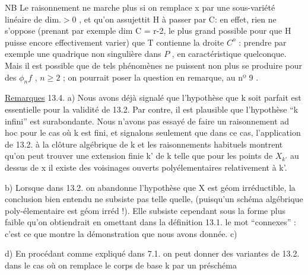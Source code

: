 
NB \quad Le raisonnement ne marche plus si on remplace x par une
sous-variété linéaire  de dim.$>0$ , et qu'on assujettit H à passer
par C: en effet, rien ne s'oppose (prenant par exemple dim C = r-2, le
plus grand possible pour que H puisse encore effectivement varier) que
T contienne la droite $C^{o}$ :
 prendre par
exemple une quadrique non singulière dans $P$ , en caractéristique quelconque. Mais il
est possible que de tels phénomènes ne puissent non plus se produire 
pour des $\phi_n f$ , $n\geq 2$ ; on pourrait poser la question en remarque, au
nº 9 .

\uline{Remarques} 13.4. \quad a) Nous avons déjà signalé que l'hypothèse que k 
soit parfait est essentielle pour la validité de 13.2. Par contre, il
est plausible que l'hypothèse ``k infini'' est surabondante. 
Nous n'avons pas essayé  de faire un raisonnement ad hoc pour le cas
où k est fini, et signalons seulement que dans ce cas, l'application de
13.2. à la clôture algébrique de k et les raisonnements habituels
montrent qu'on peut trouver une extension finie k' de k telle que
 pour les points de $X_{k'}$ au dessus de x il existe des voisinages ouverts
polyélementaires relativement à k'.

b) Lorsque dans 13.2. on abandonne l'hypothèse que X est géom
irréductible, la conclusion bien entendu ne subsiste pas telle quelle,
(puisqu'un schéma algébrique poly-élementaire est géom irréd !). Elle
subsiste cependant sous la forme plus faible qu'on obtiendrait en
omettant dans la définition 13.1. le mot ``connexes'' : c'est ce que
montre la démonstration que nous avons donnée.
c)

d) En procédant comme expliqué dans 7.1. on peut donner des variantes
de 13.2. dans le cas où on remplace le corps de base k par un préschéma
